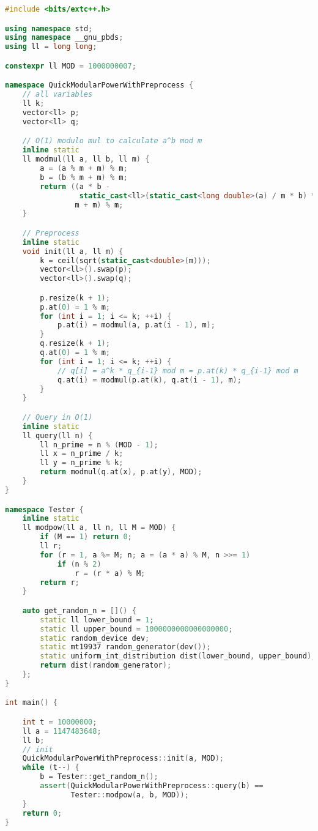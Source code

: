 \documentclass[11pt, letterpaper]{article}
\begin{document}
\begin{lstlisting}[language=C++]
#include <bits/extc++.h>

using namespace std;
using namespace __gnu_pbds;
using ll = long long;

constexpr ll MOD = 1000000007;

namespace QuickModularPowerWithPreprocess {
    // all variables
    ll k;
    vector<ll> p;
    vector<ll> q;

    // O(1) modulo mul to calculate a^b mod m
    inline static
    ll modmul(ll a, ll b, ll m) {
        a = (a % m + m) % m;
        b = (b % m + m) % m;
        return ((a * b -
                 static_cast<ll>(static_cast<long double>(a) / m * b) * m) %
                m + m) % m;
    }

    // Preprocess
    inline static
    void init(ll a, ll m) {
        k = ceil(sqrt(static_cast<double>(m)));
        vector<ll>().swap(p);
        vector<ll>().swap(q);

        p.resize(k + 1);
        p.at(0) = 1 % m;
        for (int i = 1; i <= k; ++i) {
            p.at(i) = modmul(a, p.at(i - 1), m);
        }
        q.resize(k + 1);
        q.at(0) = 1 % m;
        for (int i = 1; i <= k; ++i) {
            // q[i] = a^k * q_{i-1} mod m = p.at(k) * q_{i-1} mod m
            q.at(i) = modmul(p.at(k), q.at(i - 1), m);
        }
    }

    // Query in O(1)
    inline static
    ll query(ll n) {
        ll n_prime = n % (MOD - 1);
        ll x = n_prime / k;
        ll y = n_prime % k;
        return modmul(q.at(x), p.at(y), MOD);
    }
}

namespace Tester {
    inline static
    ll modpow(ll a, ll n, ll M = MOD) {
        if (M == 1) return 0;
        ll r;
        for (r = 1, a %= M; n; a = (a * a) % M, n >>= 1)
            if (n % 2)
                r = (r * a) % M;
        return r;
    }

    auto get_random_n = []() {
        static ll lower_bound = 1;
        static ll upper_bound = 1000000000000000000;
        static random_device dev;
        static mt19937 random_generator(dev());
        static uniform_int_distribution dist(lower_bound, upper_bound);
        return dist(random_generator);
    };
}

int main() {

    int t = 10000000;
    ll a = 1147483648;
    ll b;
    // init
    QuickModularPowerWithPreprocess::init(a, MOD);
    while (t--) {
        b = Tester::get_random_n();
        assert(QuickModularPowerWithPreprocess::query(b) ==
               Tester::modpow(a, b, MOD));
    }
    return 0;
}
\end{lstlisting}
\end{document}
